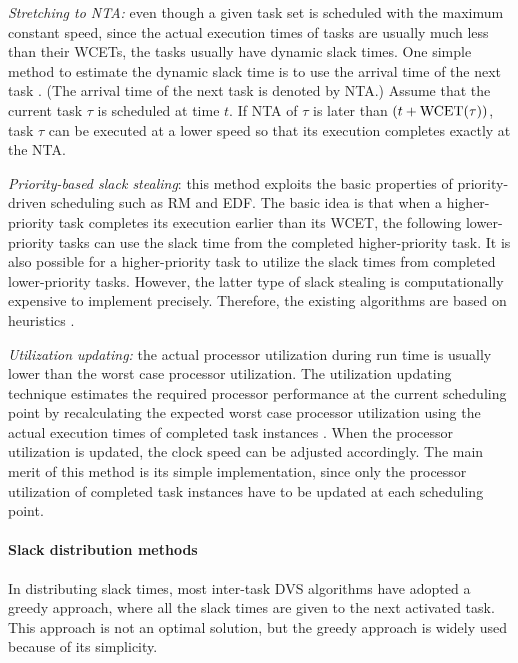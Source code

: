 \documentclass[10pt,article]{IEEEtran}
\begin{document}
\emph{Stretching to NTA:} even though a given task set  is scheduled with the maximum constant speed, since the actual execution times of tasks are usually much less than their WCETs, the tasks usually have dynamic slack times.  One simple method to estimate the dynamic slack time is to use the  arrival  time  of  the  next  task \cite{shin}. (The  arrival  time of the next task is denoted by NTA.) Assume that the current task $\tau$ is scheduled at time $t$. If NTA of $\tau$ is later than $(t + \textnormal{WCET}(\tau))$, task $\tau$ can be executed at a lower speed so that its execution completes exactly at the NTA. 


\emph{Priority-based slack stealing}: this method exploits the basic  properties of  priority-driven scheduling such as  RM and EDF. The basic idea is that when a higher-priority task completes its execution earlier than its WCET, the following lower-priority tasks  can use the  slack time from the completed higher-priority task.  It is also possible for a higher-priority task to utilize the slack times from completed lower-priority tasks.  However, the latter type of slack stealing is computationally expensive to implement precisely.  Therefore, the existing algorithms are based on heuristics \cite{aydin, kim}.

\emph{Utilization updating:} the actual processor utilization during run time is usually lower than the worst case processor utilization. The utilization updating technique estimates the required processor performance at the current scheduling point by recalculating the expected worst case processor utilization using the actual execution times of completed task instances \cite{pillai}.   When the processor utilization is updated, the clock speed can be adjusted accordingly. The main merit of this method is its simple implementation, since only the processor utilization of completed task instances have to be updated at each scheduling point.

\paragraph{Slack distribution methods} In distributing slack times, most inter-task DVS algorithms have adopted a greedy approach, where all the slack times are given to the next activated task. This  approach is not an optimal solution, but the greedy approach is widely used because of its simplicity.
\end{document}
